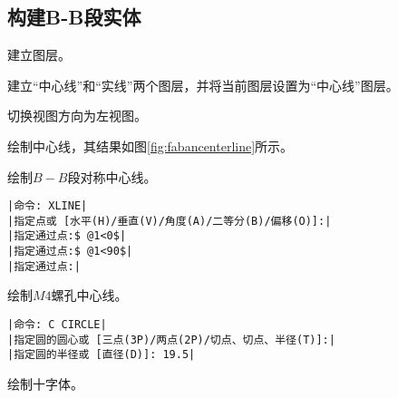 
\subsection{构建B-B段实体}
\begin{procedure}
\item 建立图层。

建立“中心线”和“实线”两个图层，并将当前图层设置为“中心线”图层。
\item 切换视图方向为左视图。
\item 绘制中心线，其结果如图\ref{fig:fabancenterline}所示。

绘制$B-B$段对称中心线。
\begin{lstlisting}
|命令: XLINE|
|指定点或 [水平(H)/垂直(V)/角度(A)/二等分(B)/偏移(O)]:|
|指定通过点:$ @1<0$|
|指定通过点:$ @1<90$|
|指定通过点:|
\end{lstlisting}
绘制$M4$螺孔中心线。
\begin{lstlisting}
|命令: C CIRCLE|
|指定圆的圆心或 [三点(3P)/两点(2P)/切点、切点、半径(T)]:|
|指定圆的半径或 [直径(D)]: 19.5|
\end{lstlisting}
\begin{figure}[htbp]
\centering
\begin{floatrow}[3]
\end{floatrow}
\end{figure}
\item 绘制十字体。


\end{procedure}
